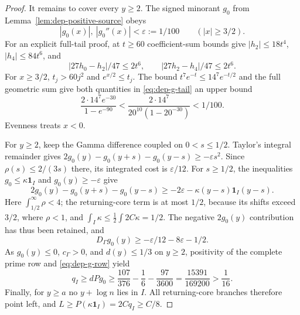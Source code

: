 \begin{proof}
It remains to cover every $y\ge2$. The signed minorant $g_0$ from
Lemma~\ref{lem:dep-positive-source} obeys
\begin{equation}\label{eq:dep-g-tail}
 |g_0(x)|,\ |g_0''(x)|<\varepsilon:=1/100\qquad(|x|\ge3/2).
\end{equation}
For an explicit full-tail proof, at $t\ge60$ coefficient-sum bounds give
$|h_2|\le18t^4$, $|h_4|\le84t^6$, and
\[
 |27h_0-h_2|/47\le2t^6,\qquad
 |27h_2-h_4|/47\le2t^6.
\]
For $x\ge3/2$, $t_j>60j^2$ and $e^{x/2}\le t_j$.
The bound $t^7e^{-t}\le14^7e^{-t/2}$ and the full geometric sum give
both quantities in \eqref{eq:dep-g-tail} an upper bound
\[
 \frac{2\cdot14^7e^{-30}}{1-e^{-90}}
 <\frac{2\cdot14^7}{20^{10}(1-20^{-30})}<1/100.
\]
Evenness treats $x<0$.

For $y\ge2$, keep the Gamma difference coupled on $0<s\le1/2$.
Taylor's integral remainder gives
$2g_0(y)-g_0(y+s)-g_0(y-s)\ge-\varepsilon s^2$.
Since $\rho(s)\le2/(3s)$ there, its integrated cost is
$\varepsilon/12$. For $s\ge1/2$, the inequalities
$g_0\le\kappa\mathbf1_I$ and $g_0(y)\ge-\varepsilon$ give
\[
 2g_0(y)-g_0(y+s)-g_0(y-s)
 \ge-2\varepsilon-\kappa(y-s)\mathbf1_I(y-s).
\]
Here $\int_{1/2}^\infty\rho<4$; the returning-core term is at most
$1/2$, because its shifts exceed $3/2$, where $\rho<1$, and
$\int_I\kappa\le\tfrac12\int2C\kappa=1/2$.
The negative $2g_0(y)$ contribution has thus been retained, and
\[
 D_\Gamma g_0(y)\ge-\varepsilon/12-8\varepsilon-1/2.
\]
As $g_0(y)\le0$, $c_\Gamma>0$, and $d(y)\le1/3$ on $y\ge2$,
positivity of the complete prime row and \eqref{eq:dep-g-row} yield
\[
 q_I\ge dPg_0
 \ge\frac{107}{376}-\frac16-\frac{97}{3600}
 =\frac{15391}{169200}>\frac1{16}.
\]
Finally, for $y\ge a$ no $y+\log n$ lies in $I$. All returning-core
branches therefore point left, and
$L\ge P(\kappa\mathbf1_I)=2Cq_I\ge C/8$.
\end{proof}

